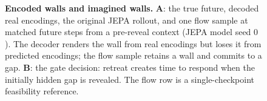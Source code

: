 \begin{figure}[t]
\centering
\renewcommand{\figureheight}{1.85in}
\caption{\textbf{Encoded walls and imagined walls.} \textbf{A}: the true future, decoded real encodings,
the original JEPA rollout, and one flow sample at matched future steps from a pre-reveal context
(JEPA model seed $0$). The decoder renders the wall from real encodings but loses it from predicted
encodings; the flow sample retains a wall and commits to a gap. \textbf{B}: the gate decision:
retreat creates time to respond when the initially hidden gap is revealed. The flow row is a
single-checkpoint feasibility reference.}
\label{fig:hero}
\end{figure}
